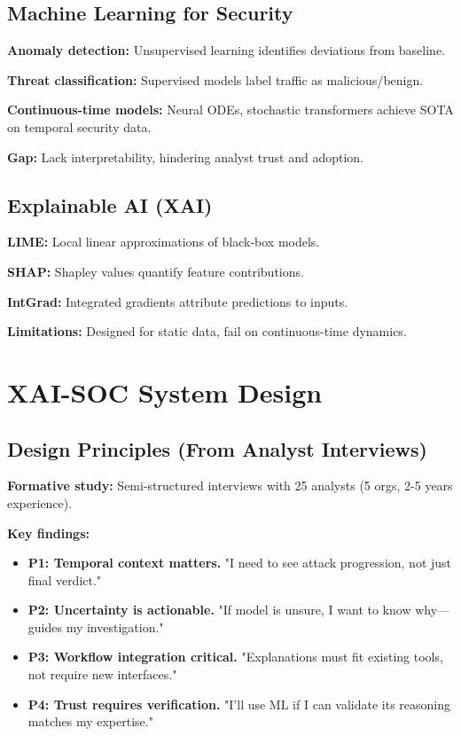 \documentclass[letterpaper,twocolumn,10pt]{article}
\begin{document}
\subsection{Machine Learning for Security}
\textbf{Anomaly detection:} Unsupervised learning identifies deviations from baseline.

\textbf{Threat classification:} Supervised models label traffic as malicious/benign.

\textbf{Continuous-time models:} Neural ODEs, stochastic transformers achieve SOTA on temporal security data.

\textbf{Gap:} Lack interpretability, hindering analyst trust and adoption.

\subsection{Explainable AI (XAI)}
\textbf{LIME:} Local linear approximations of black-box models.

\textbf{SHAP:} Shapley values quantify feature contributions.

\textbf{IntGrad:} Integrated gradients attribute predictions to inputs.

\textbf{Limitations:} Designed for static data, fail on continuous-time dynamics.

\section{XAI-SOC System Design}

\subsection{Design Principles (From Analyst Interviews)}

\textbf{Formative study:} Semi-structured interviews with 25 analysts (5 orgs, 2-5 years experience).

\textbf{Key findings:}
\begin{itemize}
\item \textbf{P1: Temporal context matters.} "I need to see attack progression, not just final verdict."
\item \textbf{P2: Uncertainty is actionable.} "If model is unsure, I want to know why—guides my investigation."
\item \textbf{P3: Workflow integration critical.} "Explanations must fit existing tools, not require new interfaces."
\item \textbf{P4: Trust requires verification.} "I'll use ML if I can validate its reasoning matches my expertise."
\end{itemize}
\end{document}
